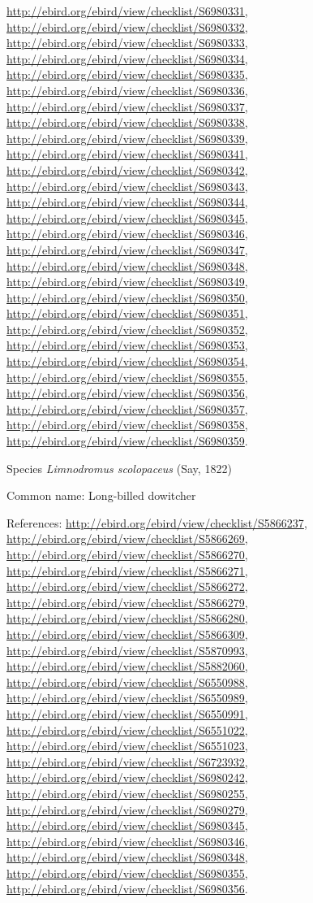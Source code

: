 \documentclass[9pt, article]{memoir}
\begin{document}
\begin{multicols}{2}
\url{http://ebird.org/ebird/view/checklist/S6980331}, 
\url{http://ebird.org/ebird/view/checklist/S6980332}, 
\url{http://ebird.org/ebird/view/checklist/S6980333}, 
\url{http://ebird.org/ebird/view/checklist/S6980334}, 
\url{http://ebird.org/ebird/view/checklist/S6980335}, 
\url{http://ebird.org/ebird/view/checklist/S6980336}, 
\url{http://ebird.org/ebird/view/checklist/S6980337}, 
\url{http://ebird.org/ebird/view/checklist/S6980338}, 
\url{http://ebird.org/ebird/view/checklist/S6980339}, 
\url{http://ebird.org/ebird/view/checklist/S6980341}, 
\url{http://ebird.org/ebird/view/checklist/S6980342}, 
\url{http://ebird.org/ebird/view/checklist/S6980343}, 
\url{http://ebird.org/ebird/view/checklist/S6980344}, 
\url{http://ebird.org/ebird/view/checklist/S6980345}, 
\url{http://ebird.org/ebird/view/checklist/S6980346}, 
\url{http://ebird.org/ebird/view/checklist/S6980347}, 
\url{http://ebird.org/ebird/view/checklist/S6980348}, 
\url{http://ebird.org/ebird/view/checklist/S6980349}, 
\url{http://ebird.org/ebird/view/checklist/S6980350}, 
\url{http://ebird.org/ebird/view/checklist/S6980351}, 
\url{http://ebird.org/ebird/view/checklist/S6980352}, 
\url{http://ebird.org/ebird/view/checklist/S6980353}, 
\url{http://ebird.org/ebird/view/checklist/S6980354}, 
\url{http://ebird.org/ebird/view/checklist/S6980355}, 
\url{http://ebird.org/ebird/view/checklist/S6980356}, 
\url{http://ebird.org/ebird/view/checklist/S6980357}, 
\url{http://ebird.org/ebird/view/checklist/S6980358}, 
\url{http://ebird.org/ebird/view/checklist/S6980359}.

\vspace{6pt}\noindent\hspace{36pt}Species \textit{Limnodromus scolopaceus} (Say, 1822)


Common name: Long-billed dowitcher

References: 
\url{http://ebird.org/ebird/view/checklist/S5866237}, 
\url{http://ebird.org/ebird/view/checklist/S5866269}, 
\url{http://ebird.org/ebird/view/checklist/S5866270}, 
\url{http://ebird.org/ebird/view/checklist/S5866271}, 
\url{http://ebird.org/ebird/view/checklist/S5866272}, 
\url{http://ebird.org/ebird/view/checklist/S5866279}, 
\url{http://ebird.org/ebird/view/checklist/S5866280}, 
\url{http://ebird.org/ebird/view/checklist/S5866309}, 
\url{http://ebird.org/ebird/view/checklist/S5870993}, 
\url{http://ebird.org/ebird/view/checklist/S5882060}, 
\url{http://ebird.org/ebird/view/checklist/S6550988}, 
\url{http://ebird.org/ebird/view/checklist/S6550989}, 
\url{http://ebird.org/ebird/view/checklist/S6550991}, 
\url{http://ebird.org/ebird/view/checklist/S6551022}, 
\url{http://ebird.org/ebird/view/checklist/S6551023}, 
\url{http://ebird.org/ebird/view/checklist/S6723932}, 
\url{http://ebird.org/ebird/view/checklist/S6980242}, 
\url{http://ebird.org/ebird/view/checklist/S6980255}, 
\url{http://ebird.org/ebird/view/checklist/S6980279}, 
\url{http://ebird.org/ebird/view/checklist/S6980345}, 
\url{http://ebird.org/ebird/view/checklist/S6980346}, 
\url{http://ebird.org/ebird/view/checklist/S6980348}, 
\url{http://ebird.org/ebird/view/checklist/S6980355}, 
\url{http://ebird.org/ebird/view/checklist/S6980356}.


\end{multicols}
\end{document}
